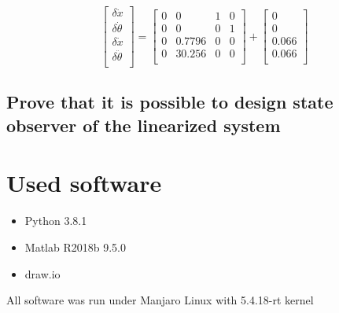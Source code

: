 \documentclass[a4paper,12pt]{article}
\begin{document}
\begin{equation}
    \begin{bmatrix}
        \delta \dot x\\
        \delta \dot \theta\\
        \delta \dot x\\
        \delta \ddot \theta\\
    \end{bmatrix}
    =
    \begin{bmatrix}
        0 & 0 & 1 & 0 \\
        0 & 0 & 0 & 1 \\
        0 & 0.7796 & 0 & 0\\
        0 & 30.256 & 0 & 0\\
    \end{bmatrix}
    +
    \begin{bmatrix}
        0\\
        0\\
        0.066\\
        0.066\\
    \end{bmatrix}
\end{equation}
\subsection{Prove that it is possible to design state observer of the linearized
system}

\section{Used software}
\begin{itemize}
    \item Python 3.8.1
    \item Matlab R2018b 9.5.0
    \item draw.io
\end{itemize}
All software was run under Manjaro Linux with 5.4.18-rt kernel
\end{document}
